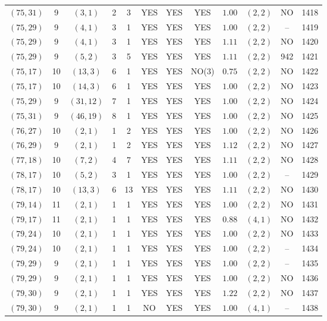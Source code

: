 \begin{longtable}{|c|c|c|c|c|c|c|c|c|c|c|c|}
$(75,31)$ & 9 & $(3,1)$ & 2 & 3 & YES & YES & YES & $1.00$ & $(2,2)$ & NO & 1418\\
$(75,29)$ & 9 & $(4,1)$ & 3 & 1 & YES & YES & YES & $1.00$ & $(2,2)$ & -- & 1419\\
$(75,29)$ & 9 & $(4,1)$ & 3 & 1 & YES & YES & YES & $1.11$ & $(2,2)$ & NO & 1420\\
$(75,29)$ & 9 & $(5,2)$ & 3 & 5 & YES & YES & YES & $1.11$ & $(2,2)$ & 942 & 1421\\
$(75,17)$ & 10 & $(13,3)$ & 6 & 1 & YES & YES & NO(3) & $0.75$ & $(2,2)$ & NO & 1422\\
$(75,17)$ & 10 & $(14,3)$ & 6 & 1 & YES & YES & YES & $1.00$ & $(2,2)$ & NO & 1423\\
$(75,29)$ & 9 & $(31,12)$ & 7 & 1 & YES & YES & YES & $1.00$ & $(2,2)$ & NO & 1424\\
$(75,31)$ & 9 & $(46,19)$ & 8 & 1 & YES & YES & YES & $1.00$ & $(2,2)$ & NO & 1425\\
$(76,27)$ & 10 & $(2,1)$ & 1 & 2 & YES & YES & YES & $1.00$ & $(2,2)$ & NO & 1426\\
$(76,29)$ & 9 & $(2,1)$ & 1 & 2 & YES & YES & YES & $1.12$ & $(2,2)$ & NO & 1427\\
$(77,18)$ & 10 & $(7,2)$ & 4 & 7 & YES & YES & YES & $1.11$ & $(2,2)$ & NO & 1428\\
$(78,17)$ & 10 & $(5,2)$ & 3 & 1 & YES & YES & YES & $1.00$ & $(2,2)$ & -- & 1429\\
$(78,17)$ & 10 & $(13,3)$ & 6 & 13 & YES & YES & YES & $1.11$ & $(2,2)$ & NO & 1430\\
$(79,14)$ & 11 & $(2,1)$ & 1 & 1 & YES & YES & YES & $1.00$ & $(2,2)$ & NO & 1431\\
$(79,17)$ & 11 & $(2,1)$ & 1 & 1 & YES & YES & YES & $0.88$ & $(4,1)$ & NO & 1432\\
$(79,24)$ & 10 & $(2,1)$ & 1 & 1 & YES & YES & YES & $1.00$ & $(2,2)$ & NO & 1433\\
$(79,24)$ & 10 & $(2,1)$ & 1 & 1 & YES & YES & YES & $1.00$ & $(2,2)$ & -- & 1434\\
$(79,29)$ & 9 & $(2,1)$ & 1 & 1 & YES & YES & YES & $1.00$ & $(2,2)$ & -- & 1435\\
$(79,29)$ & 9 & $(2,1)$ & 1 & 1 & YES & YES & YES & $1.00$ & $(2,2)$ & NO & 1436\\
$(79,30)$ & 9 & $(2,1)$ & 1 & 1 & YES & YES & YES & $1.22$ & $(2,2)$ & NO & 1437\\
$(79,30)$ & 9 & $(2,1)$ & 1 & 1 & NO & YES & YES & $1.00$ & $(4,1)$ & -- & 1438\\

\end{longtable}
